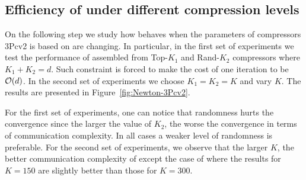 \documentclass[11pt]{article}
\begin{document}
	\subsection{Efficiency of  under different compression levels}
	
	On the following step we study how  behaves when the parameters of compressors 3Pcv2 is based on are changing. In particular, in the first set of experiments we test the performance of  assembled from Top-$K_1$ and Rand-$K_2$ compressors where $K_1+K_2=d$. Such constraint is forced to make the cost of one iteration to be $\mathcal{O}(d)$. In the second set of experiments we choose $K_1=K_2=K$ and vary $K$. The results are presented in Figure~\ref{fig:Newton-3Pcv2}. 
	
	For the first set of experiments, one can notice that randomness hurts the convergence since the larger the value of $K_2$, the worse the convergence in terms of communication complexity. In all cases a weaker level of randomness is preferable. For the second set of experiments, we observe that the larger $K$, the better communication complexity of  except the case of  where the results for $K=150$  are slightly better than those for $K=300$. 
	
\end{document}
